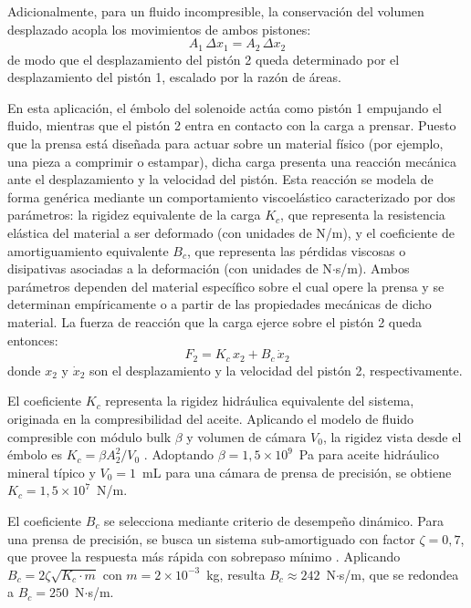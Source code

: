 \documentclass[journal]{IEEEtran}
\begin{document}
\setlength{\parskip}{1em}

Adicionalmente, para un fluido incompresible, la conservación del volumen 
desplazado acopla los movimientos de ambos pistones:
\begin{equation}
    A_1 \, \Delta x_1 = A_2 \, \Delta x_2
\label{eq:conservacion_volumen}
\end{equation}
de modo que el desplazamiento del pistón 2 queda determinado por el 
desplazamiento del pistón 1, escalado por la razón de áreas.

\setlength{\parskip}{1em}

En esta aplicación, el émbolo del solenoide actúa como pistón 1 empujando el 
fluido, mientras que el pistón 2 entra en contacto con la carga a prensar. 
Puesto que la prensa está diseñada para actuar sobre un material físico 
(por ejemplo, una pieza a comprimir o estampar), dicha carga presenta una 
reacción mecánica ante el desplazamiento y la velocidad del pistón. Esta 
reacción se modela de forma genérica mediante un comportamiento viscoelástico
caracterizado por dos parámetros: la rigidez equivalente de la carga $K_c$, 
que representa la resistencia elástica del material a ser deformado (con 
unidades de N/m), y el coeficiente de amortiguamiento equivalente $B_c$, que 
representa las pérdidas viscosas o disipativas asociadas a la deformación 
(con unidades de N$\cdot$s/m). Ambos parámetros dependen del material 
específico sobre el cual opere la prensa y se determinan empíricamente o a 
partir de las propiedades mecánicas de dicho material. La fuerza de reacción 
que la carga ejerce sobre el pistón 2 queda entonces:
\begin{equation}
    F_2 = K_c \, x_2 + B_c \, \dot{x}_2
\label{eq:carga_hidraulica}
\end{equation}
donde $x_2$ y $\dot{x}_2$ son el desplazamiento y la velocidad del pistón 2, 
respectivamente.

El coeficiente $K_c$ representa la rigidez hidráulica equivalente del sistema, originada en la compresibilidad del aceite. Aplicando el modelo de fluido compresible con módulo bulk $\beta$ y volumen de cámara $V_0$, la rigidez vista desde el émbolo es $K_c = \beta A_2^2 / V_0$ \cite{merritt1967}. Adoptando $\beta = 1{,}5 \times 10^{9}$~Pa para aceite hidráulico mineral típico y $V_0 = 1$~mL para una cámara de prensa de precisión, se obtiene $K_c = 1{,}5 \times 10^{7}$~N/m.

 
El coeficiente $B_c$ se selecciona mediante criterio de desempeño dinámico. Para una prensa de precisión, se busca un sistema sub-amortiguado con factor $\zeta = 0{,}7$, que provee la respuesta más rápida con sobrepaso mínimo \cite{ogata2010}. Aplicando $B_c = 2\zeta\sqrt{K_c \cdot m}$ con $m = 2 \times 10^{-3}$~kg, resulta $B_c \approx 242$~N$\cdot$s/m, que se redondea a $B_c = 250$~N$\cdot$s/m.
\end{document}
